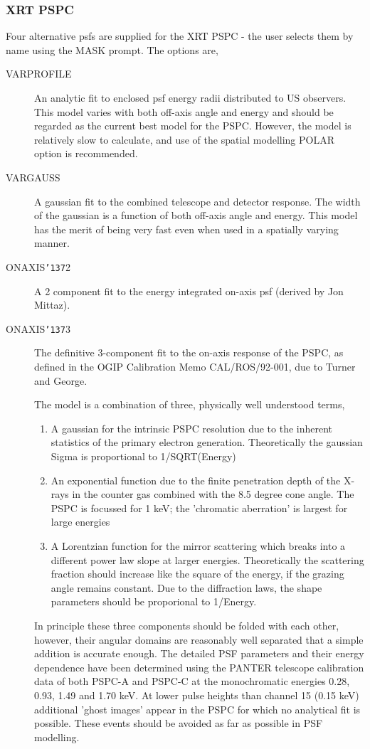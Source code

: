 \documentclass{book}
\renewcommand{\_}{{\tt\char'137}}     %
\begin{document}
\subsubsection{XRT PSPC}
Four alternative psfs are supplied for the XRT PSPC - the user
selects them by name using the MASK prompt. The options are,

\begin{description}
\item[VARPROFILE]
An analytic fit to enclosed psf energy radii distributed to
US observers. This model varies with both off-axis angle and
energy and should be regarded as the current best model for
the PSPC. However, the model is relatively slow to calculate,
and use of the spatial modelling POLAR option is recommended.
\item[VARGAUSS]
A gaussian fit to the combined telescope and detector
response. The width of the gaussian is a function of
both off-axis angle and energy. This model has the merit of
being very fast even when used in a spatially varying manner.
\item[ONAXIS\_2]
A 2 component fit to the energy integrated on-axis psf
(derived by Jon Mittaz).
\item[ONAXIS\_3]
The definitive 3-component fit to the on-axis response of the
PSPC, as defined in the OGIP Calibration Memo CAL/ROS/92-001,
due to Turner and George.

The model is a combination of three, physically well understood
terms,


\begin{enumerate}
\item A gaussian for the intrinsic PSPC resolution due to the
inherent statistics of the primary electron generation.
Theoretically the gaussian Sigma is proportional to
1/SQRT(Energy)
\item An exponential function due to the finite penetration
depth of the X-rays in the counter gas combined with the
8.5 degree cone angle. The PSPC is focussed for 1 keV; the
'chromatic aberration' is largest for large energies
\item A Lorentzian function for the mirror scattering which breaks
into a different power law slope at larger energies.
Theoretically the scattering fraction should increase like
the square of the energy, if the grazing angle remains
constant. Due to the diffraction laws, the shape parameters
should be proporional to 1/Energy.
\end{enumerate}
In principle these three components should be folded with each
other, however, their angular domains are reasonably well
separated that a simple addition is accurate enough. The
detailed PSF parameters and their energy dependence have been
determined using the PANTER telescope calibration data of both
PSPC-A and PSPC-C at the monochromatic energies 0.28, 0.93,
1.49 and 1.70 keV. At lower pulse heights than channel 15
(0.15 keV) additional 'ghost images' appear in the PSPC for
which no analytical fit is possible. These events should be
avoided as far as possible in PSF modelling.

\end{description}
\end{document}
